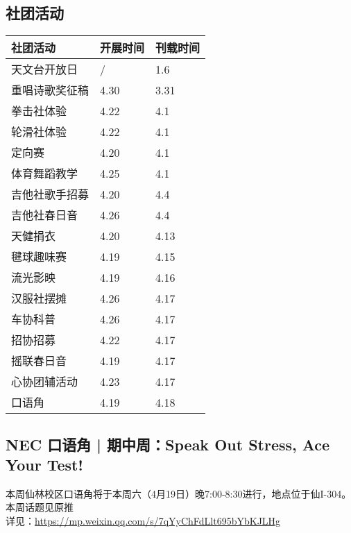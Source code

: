 \documentclass[letterpaper, 12pt]{article}
\begin{document}
\begin{multicols}{2}
\section{社团活动}
\begin{tabular}{|>{\centering\arraybackslash}m{}|m{}|m{}|}
    \hline
    社团活动 & 开展时间 & 刊载时间\\
    \hline\hline
    天文台开放日 & / & 1.6\\
    重唱诗歌奖征稿 & 4.30 & 3.31\\
    拳击社体验 & 4.22 & 4.1\\
    轮滑社体验 & 4.22 & 4.1\\
    定向赛 & 4.20 & 4.1\\
    体育舞蹈教学 & 4.25 & 4.1\\
    吉他社歌手招募 & 4.20 & 4.4\\
    吉他社春日音 & 4.26 & 4.4\\
    天健捐衣 & 4.20 & 4.13\\
    毽球趣味赛 & 4.19 & 4.15\\
    流光影映 & 4.19 & 4.16\\
    汉服社摆摊 & 4.26 & 4.17\\
    车协科普 & 4.26 & 4.17\\
    招协招募 & 4.22 & 4.17\\
    摇联春日音 & 4.19 & 4.17\\
    心协团辅活动 & 4.23 & 4.17\\
    口语角 & 4.19 & 4.18\\
    \hline
\end{tabular}
\subsection{NEC 口语角 | 期中周：Speak Out Stress, Ace Your Test!}
本周仙林校区口语角将于本周六（4月19日）晚7:00-8:30进行，地点位于仙I-304。
\\本周话题见原推
\\详见：\url{https://mp.weixin.qq.com/s/7qYyChFdLlt695bYbKJLHg}
\end{multicols}
\end{document}
